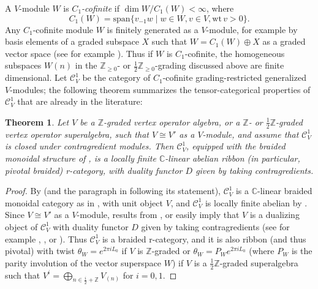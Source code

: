 \documentclass[11pt, reqno]{amsart}
\newtheorem{thm}{Theorem}[section]
\theoremstyle{definition}\newtheorem{defi}[thm]{Definition}
\theoremstyle{definition}\newtheorem{rem}[thm]{Remark}
\theoremstyle{definition}\newtheorem{exam}[thm]{Example}
\theoremstyle{definition}\newtheorem{assum}[thm]{Assumption}
\newcommand{\cC}{\mathcal{C}}
\newcommand{\CC}{\mathbb{C}}
\newcommand{\ZZ}{\mathbb{Z}}
\begin{document}
A $V$-module $W$ is \textit{$C_1$-cofinite} if $\dim W/C_1(W)<\infty$, where
\begin{equation*}
C_1(W) =\mathrm{span}\lbrace v_{-1} w\mid w\in W, v\in V, \mathrm{wt}\,v>0\rbrace.
\end{equation*}
Any $C_1$-cofinite module $W$ is finitely generated as a $V$-module, for example by basis elements of a graded subspace $X$ such that $W=C_1(W)\oplus X$ as a graded vector space (see for example \cite[Proposition 2.1]{CMY1}).
Thus if $W$ is $C_1$-cofinite, the homogeneous subspaces $W(n)$ in the $\ZZ_{\geq 0}$- or $\frac{1}{2}\ZZ_{\geq 0}$-grading discussed above are finite dimensional.
Let $\cC^1_V$ be the category of $C_1$-cofinite grading-restricted generalized $V$-modules; the following theorem summarizes the tensor-categorical properties of $\cC^1_V$ that are already in the literature:
\begin{thm}\label{thm:old-C1-properties}
Let $V$ be a $\ZZ$-graded vertex operator algebra, or a $\ZZ$- or $\frac{1}{2}\ZZ$-graded vertex operator superalgebra, such that $V\cong V'$ as a $V$-module, and assume that $\cC^1_V$ is closed under contragredient modules. Then $\cC^1_V$, equipped with the braided monoidal structure of \cite{HLZ8}, is a locally finite $\CC$-linear abelian ribbon (in particular, pivotal braided) r-category, with duality functor $D$ given by taking contragredients.
\end{thm}
\begin{proof}
By \cite[Theorem 1.2]{Hu} (and the paragraph in \cite{Hu} following its statement), $\cC^1_V$ is a $\CC$-linear braided monoidal category as in \cite{HLZ8}, with unit object $V$, and $\cC^1_V$ is locally finite abelian by \cite[Theorem 2.9]{McR-Deligne}. Since $V\cong V'$ as a $V$-module, results from \cite[Section 5]{FHL}, or \cite{HLZ2} easily imply that $V$ is a dualizing object of $\cC^1_V$ with duality functor $D$ given by taking contragredients (see for example \cite[Section 5.1]{CKM2}, \cite[Section 4.3]{CMY2}, or \cite[Theorem 2.12]{ALSW}). Thus $\cC^1_V$ is a braided r-category, and it is also ribbon (and thus pivotal) with twist $\theta_W=e^{2\pi i L_0}$ if $V$ is $\ZZ$-graded or $\theta_W=P_We^{2\pi i L_0}$ (where $P_W$ is the parity involution of the vector superspace $W$) if $V$ is a $\frac{1}{2}\ZZ$-graded superalgebra such that $V^i=\bigoplus_{n\in\frac{i}{2}+\ZZ} V_{(n)}$ for $i=0,1$. 
\end{proof}
\end{document}
